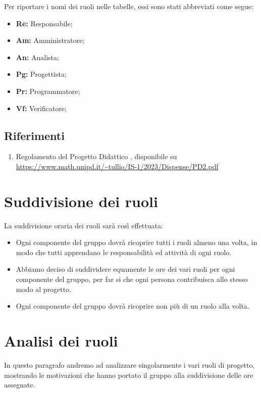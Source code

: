 \documentclass[a4paper, 11pt]{article}
\begin{document}
Per riportare i nomi dei ruoli nelle tabelle, essi sono stati abbreviati come segue:
\begin{itemize}
    \item \textbf{Re:} Responsabile;
    \item \textbf{Am:} Amministratore;
    \item \textbf{An:} Analista;
    \item \textbf{Pg:} Progettista;
    \item \textbf{Pr:} Programmatore;
    \item \textbf{Vf:} Verificatore;
\end{itemize} 

\vspace{10pt}
\subsection{Riferimenti}
\begin{enumerate}
    \item Regolamento del Progetto Didattico , disponibile su  \url{https://www.math.unipd.it/~tullio/IS-1/2023/Dispense/PD2.pdf}
\end{enumerate}

\pagebreak

\section{Suddivisione dei ruoli}

La suddivisione oraria dei ruoli sarà così effettuata:
\begin{itemize}
    \item Ogni componente del gruppo dovrà ricoprire tutti i ruoli almeno una volta, in modo che tutti apprendano le responsabilità ed attività di ogni ruolo.

    \item Abbiamo deciso di suddividere equamente le ore dei vari ruoli per ogni componente del gruppo, per far si che ogni persona contribuisca allo stesso modo al progetto.
    
    \item Ogni componente del gruppo dovrà ricoprire non più di un ruolo alla volta.
\end{itemize}
\vspace{5pt}

\section{Analisi dei ruoli}
In questo paragrafo andremo ad analizzare singolarmente i vari ruoli di progetto, mostrando le motivazioni che hanno portato il gruppo alla suddivisione delle ore assegnate.
\end{document}
